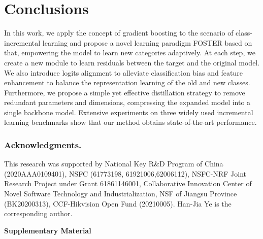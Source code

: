 \documentclass[runningheads]{llncs}
\begin{document}
\section{Conclusions}
In this work, we apply the concept of gradient boosting to the scenario of class-incremental learning and propose a novel learning paradigm FOSTER based on that, empowering the model to learn new categories adaptively. At each step, we create a new module to learn residuals between the target and the original model. We also introduce logits alignment to alleviate classification bias and feature enhancement to balance the representation learning of the old and new classes. Furthermore, we propose a simple yet effective distillation strategy to remove redundant parameters and dimensions, compressing the expanded model into a single backbone model. Extensive experiments on three widely used incremental learning benchmarks show that our method obtains state-of-the-art performance. 
\subsubsection*{Acknowledgments.}
This research was supported by National Key
R\&D Program of China (2020AAA0109401), NSFC (61773198, 61921006,62006112), NSFC-NRF Joint Research Project under Grant 61861146001, Collaborative Innovation Center of Novel Software Technology and Industrialization, NSF of Jiangsu Province (BK20200313), CCF-Hikvision Open Fund (20210005). Han-Jia Ye is the corresponding author.

\clearpage



\newpage

\setcounter{section}{0}
\renewcommand{\thesection}{\Roman{section}}
\begin{center}
	\textbf{\large Supplementary Material }
\end{center}

\setcounter{equation}{0}
\setcounter{figure}{0}
\setcounter{table}{0}
\setcounter{page}{1}
\end{document}
